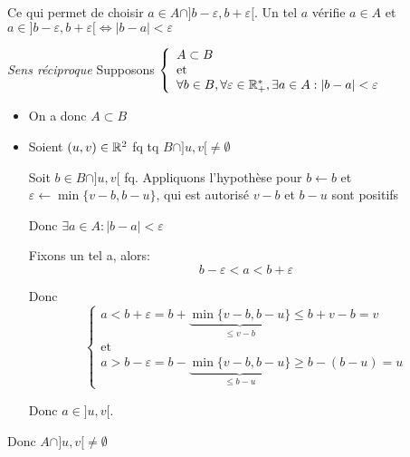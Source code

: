 \documentclass{article}
\begin{document}
\begin{question_kholle}
\begin{itemize}[label=\textemdash]
            Ce qui permet de choisir $a \in A \cap ]b - \varepsilon,  b + \varepsilon[$.
            Un tel $a$ vérifie $a \in A$ et $a \in ]b - \varepsilon,  b + \varepsilon[ \iff |b-a| < \varepsilon$
		\end{itemize}
		\bigbreak
    	\noindent \emph{Sens réciproque} Supposons $\left\{\begin{array}{ll} A \subset B \\\mathrm{et}\\ \forall b \in B, \forall \varepsilon \in \mathbb R_+^*, \exists a \in A: |b-a|< \varepsilon \end{array}\right.$

        \begin{itemize}
            \item On a donc $A \subset B$
            \item Soient $(u, v) \in \mathbb R^2$ fq tq $B \cap ]u, v[ \neq \emptyset$

			Soit $b \in B \cap ]u, v[$ fq.
            Appliquons l'hypothèse pour $b\leftarrow b$ et $\varepsilon \leftarrow \min\{v - b, b - u\}$, qui est autorisé $v-b$ et $b-u$ sont positifs

            Donc $\exists a \in A: | b - a| < \varepsilon $

            Fixons un tel a, alors:
            $$
                b-\varepsilon < a < b + \varepsilon
            $$

            Donc $$
            \left\{\begin{array}{ll}
            a < b + \varepsilon = b + \underbrace{\min\{v - b, b - u\}}_{\leqslant v - b} \leqslant b + v - b = v \\ \mathrm{et}\\
            a > b - \varepsilon = b - \underbrace{\min\{v - b, b - u\}}_{\leqslant b - u} \geqslant b - (b - u) = u
            \end{array}\right.
            $$

            Donc $a \in ]u, v[$.
        \end{itemize}
        Donc $A \cap ]u, v[ \neq \emptyset$

	\end{question_kholle}
\end{document}
